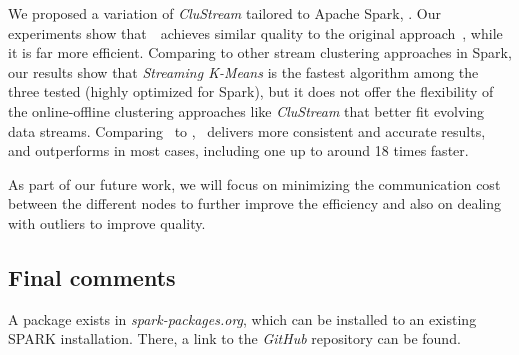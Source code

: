 We proposed a variation of \emph{CluStream} tailored to Apache Spark, \our.
Our experiments show that~\our~achieves similar quality to the original approach~\cite{clustreamOrig}, while it is far more efficient.
Comparing to other stream clustering approaches in Spark, our results show that \textit{Streaming K-Means} is the fastest algorithm among the three tested (highly optimized for Spark), but it does not offer the flexibility of the online-offline clustering approaches like \textit{CluStream} that better fit evolving data streams. 
Comparing \our~to \huawei, \our~delivers more consistent and accurate results, and outperforms \huawei in most cases, including one up to around 18 times faster. 

As part of our future work, we will focus on minimizing the communication cost between the different nodes to further improve the efficiency and also on dealing with outliers to improve quality.

\subsection{Final comments}
A package \our exists in \textit{spark-packages.org}, which can be installed to an existing SPARK installation. There, a link to the \textit{GitHub} repository can be found.




